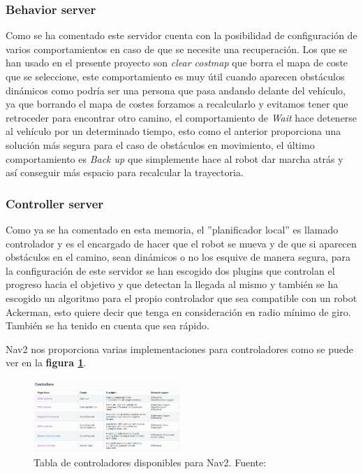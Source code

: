 \subsubsection{Behavior server}
Como se ha comentado este servidor cuenta con la posibilidad de configuración de varios comportamientos en caso de que se necesite una recuperación. 
Los que se han usado en el presente proyecto son \textit{clear costmap} que borra el mapa de coste que se seleccione, este comportamiento es 
muy útil cuando aparecen obstáculos dinámicos como podría ser una persona que pasa andando delante del vehículo, ya que borrando el mapa 
de costes forzamos a recalcularlo y evitamos tener que retroceder para encontrar otro camino, el comportamiento de \textit{Wait} hace detenerse al vehículo 
por un determinado tiempo, esto como el anterior proporciona una solución más segura para el caso de obstáculos en movimiento, el último comportamiento 
es \textit{Back up} que simplemente hace al robot dar marcha atrás y así conseguir más espacio para recalcular la trayectoria.

\subsubsection{Controller server}



Como ya se ha comentado en esta memoria, el ''planificador local'' es llamado controlador y es el encargado de hacer que el robot se mueva 
y de que si aparecen obstáculos en el camino, sean dinámicos o no los esquive de manera segura, para la configuración de este servidor se han escogido dos plugins 
que controlan el progreso hacia el objetivo y que detectan la llegada al mismo y también se ha escogido un algoritmo para el propio controlador 
que sea compatible con un robot Ackerman, esto quiere decir que tenga en consideración en radio mínimo de giro. También se ha tenido en cuenta que sea rápido.

Nav2 nos proporciona varias implementaciones para controladores como se puede ver en la \textbf{figura \ref{fig:controllers_tabla}}. 
\begin{figure}[H]
    \centering
    \includegraphics[width=0.5\textwidth]{images/Controllers_tabla.png}
    \caption{Tabla de controladores disponibles para Nav2. Fuente: \cite{nav2}}
    \label{fig:controllers_tabla}
\end{figure}

